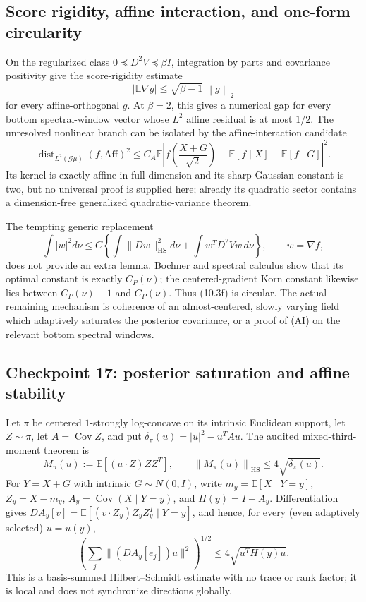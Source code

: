 \documentclass[11pt]{article}
\theoremstyle{definition}
\theoremstyle{remark}
\newcommand{\E}{\mathbb E}
\newcommand{\Cov}{\operatorname{Cov}}
\newcommand{\HS}{\mathrm{HS}}
\newcommand{\1}{\mathbf 1}
\newcommand{\norm}[1]{\left\lVert #1\right\rVert}
\begin{document}
\subsection{Score rigidity, affine interaction, and one-form circularity}

On the regularized class \(0\preceq D^2V\preceq\beta I\), integration by
parts and covariance positivity give the score-rigidity estimate
\[
 |\E\nabla g|\le\sqrt{\beta-1}\,\norm g_2           \tag{10.3e}
\]
for every affine-orthogonal \(g\).  At \(\beta=2\), this gives a numerical
gap for every bottom spectral-window vector whose \(L^2\) affine residual
is at most \(1/2\).  The unresolved nonlinear branch can be isolated by
the affine-interaction candidate
\[
 \operatorname{dist}_{L^2(\mathcal G\mu)}(f,\mathrm{Aff})^2
 \le C_A\E\left|f\left(\frac{X+G}{\sqrt2}\right)
 -\E[f\mid X]-\E[f\mid G]\right|^2.                 \tag{AI}
\]
Its kernel is exactly affine in full dimension and its sharp Gaussian
constant is two, but no universal proof is supplied here; already its
quadratic sector contains a dimension-free generalized quadratic-variance
theorem.

The tempting generic replacement
\[
 \int|w|^2d\nu\le C\left\{\int\|Dw\|_{\HS}^2d\nu
              +\int w^TD^2Vw\,d\nu\right\},
 \qquad w=\nabla f,                                  \tag{10.3f}
\]
does not provide an extra lemma.  Bochner and spectral calculus show that
its optimal constant is exactly \(C_P(\nu)\); the centered-gradient Korn
constant likewise lies between \(C_P(\nu)-1\) and \(C_P(\nu)\).
Thus (10.3f) is circular.  The actual remaining mechanism is coherence of
an almost-centered, slowly varying field which adaptively saturates the
posterior covariance, or a proof of (AI) on the relevant bottom spectral
windows.

\subsection{Checkpoint 17: posterior saturation and affine stability}

Let \(\pi\) be centered \(1\)-strongly log-concave on its intrinsic
Euclidean support, let \(Z\sim\pi\), let \(A=\Cov Z\), and put
\(\delta_\pi(u)=|u|^2-u^TAu\).  The audited mixed-third-moment theorem is
\[
 M_\pi(u):=\E[(u\cdot Z)ZZ^T],\qquad
 \norm{M_\pi(u)}_{\HS}\le4\sqrt{\delta_\pi(u)}.       \tag{17.1}
\]
For \(Y=X+G\) with intrinsic \(G\sim N(0,I)\), write
\(m_y=\E[X\mid Y=y]\), \(Z_y=X-m_y\),
\(A_y=\Cov(X\mid Y=y)\), and \(H(y)=I-A_y\).  Differentiation gives
\(D A_y[v]=\E[(v\cdot Z_y)Z_yZ_y^T\mid Y=y]\), and hence, for every
(even adaptively selected) \(u=u(y)\),
\[
 \left(\sum_j\|(D A_y[e_j])u\|^2\right)^{1/2}
 \le4\sqrt{u^TH(y)u}.                                \tag{17.2}
\]
This is a basis-summed Hilbert--Schmidt estimate with no trace or rank
factor; it is local and does not synchronize directions globally.
\end{document}
